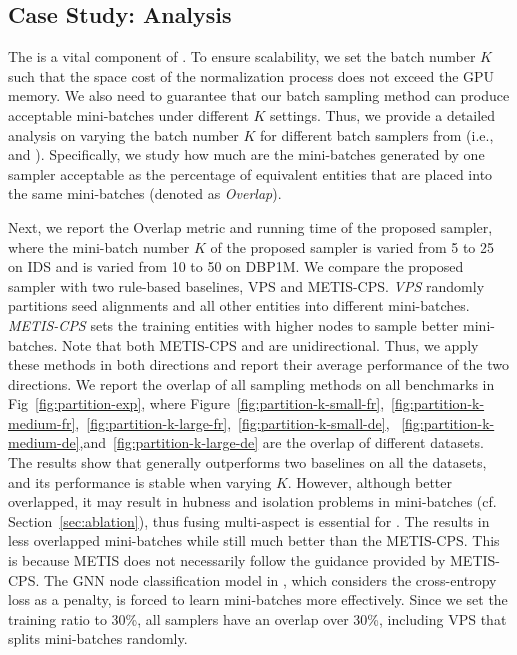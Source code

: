 \subsection{Case Study: \Sampling{} Analysis}
\label{sec:exp_minibatchgeneration}

The \Sampling{} is a vital component of \ClusterEA{}. To ensure scalability, we set the batch number $K$ such that the space cost of the normalization process does not exceed the GPU memory. We also need to guarantee that our batch sampling method can produce acceptable mini-batches under different $K$ settings.
Thus, we provide a detailed analysis on varying the batch number $K$ for different batch samplers from \Sampling{} (i.e., \MetisGCN{} and \KMeans{}). Specifically, we study how much are the mini-batches generated by one sampler acceptable as the percentage of equivalent entities that are placed into the same mini-batches (denoted as \textit{Overlap}).

Next, we report the Overlap metric and running time of the proposed sampler, where the mini-batch number $K$ of the proposed sampler is varied from 5 to 25 on IDS and is varied from 10 to 50 on DBP1M. We compare the proposed sampler with two rule-based baselines, VPS and METIS-CPS. \emph{VPS} randomly partitions seed alignments and all other entities into different mini-batches. \emph{METIS-CPS} sets the training entities with higher nodes to sample better mini-batches.
Note that both METIS-CPS and \MetisGCN{} are unidirectional. Thus, we apply these methods in both directions and report their average performance of the two directions. We report the overlap of all sampling methods on all benchmarks in Fig~\ref{fig:partition-exp}, where Figure~\ref{fig:partition-k-small-fr},~\ref{fig:partition-k-medium-fr},~\ref{fig:partition-k-large-fr},~\ref{fig:partition-k-small-de}, ~\ref{fig:partition-k-medium-de},and~\ref{fig:partition-k-large-de} are the overlap of different datasets. The results show that \KMeans{} generally outperforms two baselines on all the datasets, and its performance is stable when varying $K$. However, although better overlapped, it may result in hubness and isolation problems in mini-batches (cf. Section~\ref{sec:ablation}), thus fusing multi-aspect is essential for \ClusterEA{}. The \MetisGCN{} results in less overlapped mini-batches while still much better than the METIS-CPS. This is because METIS does not necessarily follow the guidance provided by METIS-CPS. The GNN node classification model in \MetisGCN{}, which considers the cross-entropy loss as a penalty, is forced to learn mini-batches more effectively. Since we set the training ratio to 30\%, all samplers have an overlap over 30\%, including VPS that splits mini-batches randomly.

